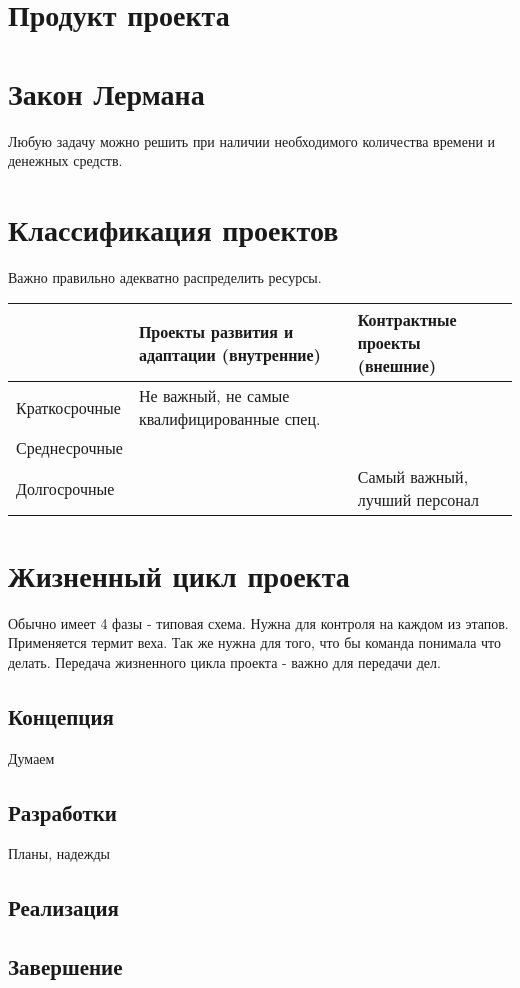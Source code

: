 \section{Продукт проекта}

\section{Закон Лермана}
Любую задачу можно решить при наличии необходимого количества времени и денежных средств.

\section{Классификация проектов}

Важно правильно адекватно распределить ресурсы.

\begin{table}[h!]
\begin{tabular}{|l|l|l|}
\hline
              & Проекты развития и адаптации (внутренние)   & Контрактные проекты (внешние) \\ \hline
Краткосрочные & Не важный, не самые квалифицированные спец. &                               \\ \hline
Среднесрочные &                                             &                               \\ \hline
Долгосрочные  &                                             & Самый важный, лучший персонал \\ \hline
\end{tabular}
\end{table}

\section{Жизненный цикл проекта}

Обычно имеет 4 фазы - типовая схема. Нужна для контроля на каждом из этапов. Применяется термит веха. Так же нужна для того, что бы команда понимала что делать. Передача жизненного цикла проекта - важно для передачи дел.

\subsection{Концепция}
Думаем
\subsection{Разработки}
Планы, надежды
\subsection{Реализация}
\subsection{Завершение}
